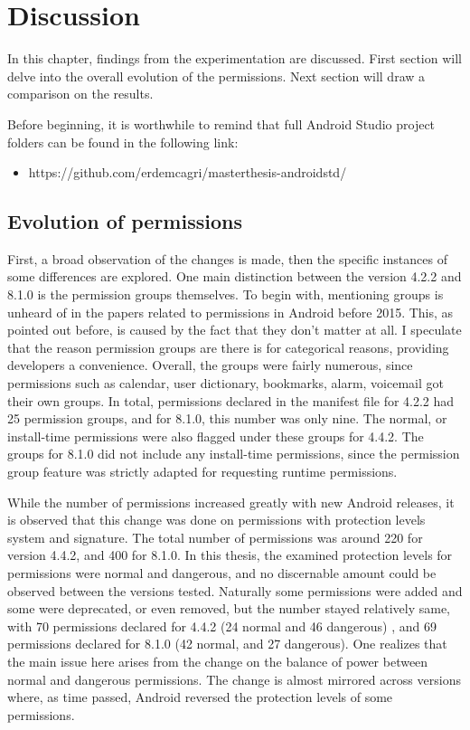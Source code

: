 \documentclass[
  a4paper,  %
  twoside,  %
  bibliography=totoc,
  headsepline,
  cleardoublepage=empty,
  parskip=half,
  draft=false,
  open=any
]{scrbook}
\begin{document}
\chapter{Discussion}
\label{cha:discussion}
In this chapter, findings from the experimentation are discussed. First section will delve into the overall evolution of the permissions. Next section will draw a comparison on the results.

Before beginning, it is worthwhile to remind that full Android Studio project folders can be found in the following link:
\begin{itemize}
	\item https://github.com/erdemcagri/masterthesis-androidstd/
\end{itemize}

\section{Evolution of permissions}
First, a broad observation of the changes is made, then the specific instances of some differences are explored. One main distinction between the version 4.2.2 and 8.1.0 is the permission groups themselves. To begin with, mentioning groups is unheard of in the papers related to permissions in Android before 2015. This, as pointed out before, is caused by the fact that they don't matter at all. I speculate that the reason permission groups are there is for categorical reasons, providing developers a convenience. Overall, the groups were fairly numerous, since permissions such as calendar, user dictionary, bookmarks, alarm, voicemail got their own groups. In total, permissions declared in the manifest file for 4.2.2 had 25 permission groups, and for 8.1.0, this number was only nine. The normal, or install-time permissions were also flagged under these groups for 4.4.2. The groups for 8.1.0 did not include any install-time permissions, since the permission group feature was strictly adapted for requesting runtime permissions.

While the number of permissions increased greatly with new Android releases, it is observed that this change was done on permissions with protection levels system and signature. The  total number of permissions was around 220 for version 4.4.2, and 400 for 8.1.0. In this thesis, the examined protection levels for permissions were normal and dangerous, and no discernable amount could be observed between the versions tested. Naturally some permissions were added and some were deprecated, or even removed, but the number stayed relatively same, with 70 permissions declared for 4.4.2 (24 normal and 46 dangerous) , and 69 permissions declared for 8.1.0 (42 normal, and 27 dangerous). One realizes that the main issue here arises from the change on the balance of power between normal and dangerous permissions. The change is almost mirrored across versions where, as time passed, Android reversed the protection levels of some permissions. 
\end{document}
